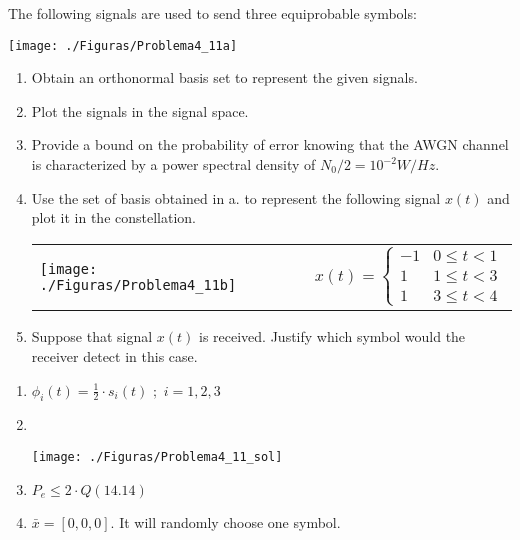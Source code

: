 \documentclass[idioma,boletin]{uah}
\begin{document}
{

	The following signals are used to send three equiprobable symbols: 
 
 \begin{figure*}[h!] 	\centering\texttt{[image: ./Figuras/Problema4\_11a]} 	\end{figure*}
	
	\begin{enumerate}
		\item Obtain an orthonormal basis set to represent the given signals. 
		\item Plot the signals in the signal space. 
		\item Provide a bound on the probability of error knowing that the AWGN channel is characterized by a power spectral density of $N_0/2 = 10^{-2}  W/Hz$. 
		\item Use the set of basis obtained in a. to represent the following signal $x(t)$ and plot it in the constellation. 
				\\
		\begin{tabular}{lr}
			\texttt{[image: ./Figuras/Problema4\_11b]} &
			\begin{math}
			x(t) = \left\{ \begin{array}{ll} -1 & 0\leq t < 1 \\ 1 & 1 \leq t < 3  \\ 1 & 3 \leq t < 4 \end{array} \right. 
			\end{math}  \\
		\end{tabular}
		\item Suppose that signal $x(t)$ is received. Justify which symbol would the receiver detect in this case. 
	\end{enumerate}

}
{
\begin{enumerate}
	\item $\phi_i(t) = \frac{1}{2} \cdot s_i(t) \,\, ; \, \, i=1,2,3$
	
	\item \ \\
	\begin{figure*}[h!] 	\centering\texttt{[image: ./Figuras/Problema4\_11\_sol]} 	\end{figure*}
	\item $P_e \leq 2 \cdot Q(14.14)$
	\item $\bar{x} = [0,0,0]$. It will randomly choose one symbol.
\end{enumerate}
}
\end{document}
